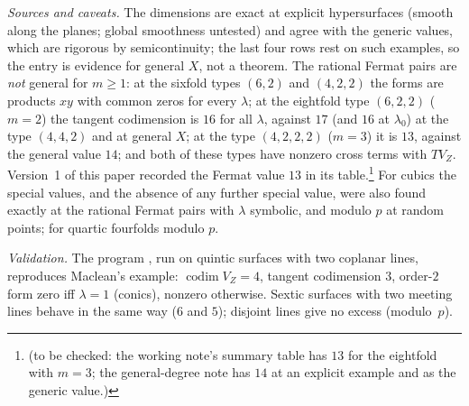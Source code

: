 \documentclass[10pt]{article}
\numberwithin{equation}{section}
\theoremstyle{remark}
\newcommand{\PP}{\mathbb{P}}
\newcommand{\NL}{\mathrm{NL}}
\newcommand{\VZ}{V_Z}
\newcommand{\codim}{\operatorname{codim}}
\newcommand{\tbc}[1]{\footnote{(to be checked: #1)}}
\begin{document}
\begin{table}[t]
\caption{Incidences with excess: two $k$-planes meeting in a $\PP^m$ in a hypersurface of degree $d$. ``Excess''
is $\dim T\NL(\lambda)/T\VZ$ for general $X$: at general $\lambda$ / at $\lambda_0$. In the last four rows the
conclusion of Theorem~D(4)(c) is verified at explicit examples only. Known: for the rows $(5,1,0)$ and
$(d\ge6,1,0)$, non-reducedness for $\lambda\notin\{0,1\}$ (Maclean \cite{Mac2}, Dan \cite{Dan,Dan2}; see
Remark~\ref{rem:D}(b)); for the row $(4,2,0)$, the value $\lambda_0=-1$ \cite[Prop.~6.1, Cor.~6.2]{Kl1}; for the
first two rows, the value $\lambda_0=1$ \cite[Prop.~6.4, Cor.~6.5]{Kl1}; for the rows with $c=1$, the value
$\lambda_0=1$ (Dan, \cite[Thm 5]{Mo1}, \cite{Kl2}).}\label{tab:other}
\end{table}

\emph{Sources and caveats.} The dimensions are exact at explicit hypersurfaces (smooth along the planes; global
smoothness untested) and agree with the generic values, which are rigorous by semicontinuity; the last four
rows rest on such examples, so the entry is evidence for general $X$, not a theorem. The rational Fermat pairs
are \emph{not} general for $m\ge1$: at the sixfold types $(6,2)$ and $(4,2,2)$ the forms are products $xy$ with
common zeros for every $\lambda$; at the eightfold type $(6,2,2)$ ($m=2$) the tangent codimension is $16$ for
all $\lambda$, against $17$ (and $16$ at $\lambda_0$) at the type $(4,4,2)$ and at general $X$; at the type
$(4,2,2,2)$ ($m=3$) it is $13$, against the general value $14$; and both of these types have nonzero cross
terms with $T\VZ$. Version~1 of this paper recorded the Fermat value $13$ in its table.\tbc{the working note's
summary table has $13$ for the eightfold with $m=3$; the general-degree note has $14$ at an explicit example and
as the generic value.} For cubics the special values, and the absence of any further special value, were also
found exactly at the rational Fermat pairs with $\lambda$ symbolic, and modulo $p$ at random points; for
quartic fourfolds modulo $p$.

\emph{Validation.} The program , run on quintic surfaces with two coplanar lines, reproduces
Maclean's example: $\codim\VZ=4$, tangent codimension $3$, order-$2$ form zero iff $\lambda=1$ (conics), nonzero
otherwise. Sextic surfaces with two meeting lines behave in the same way ($6$ and $5$); disjoint lines give no
excess (modulo~$p$).
\end{document}
